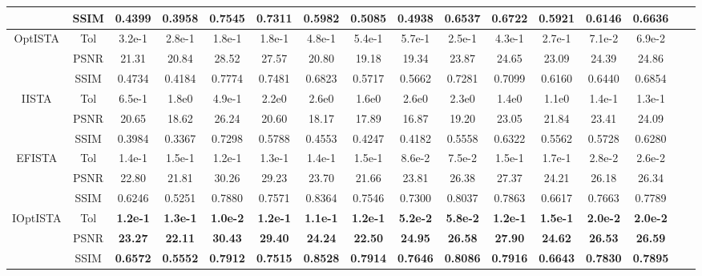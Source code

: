 \documentclass{article}
\begin{document}
\begin{table*}[thp]
\begin{center}
\begin{tabular}{c|c|c c | cc | cc| cc| cc| cc cc }
      & SSIM & 0.4399 &0.3958 & 0.7545 & 0.7311  & 0.5982 & 0.5085 & 0.4938 & 0.6537 & 0.6722 & 0.5921 & 0.6146 & 0.6636  \\\hline
    \multirow{3}{*}{OptISTA} & Tol & 3.2e-1 & 2.8e-1 & 1.8e-1 & 1.8e-1  & 4.8e-1 & 5.4e-1 & 5.7e-1 & 2.5e-1 & 4.3e-1 & 2.7e-1 & 7.1e-2  & 6.9e-2    \\
	  & PSNR & 21.31 & 20.84 & 28.52 & 27.57  & 20.80 & 19.18 & 19.34 & 23.87 & 24.65 & 23.09 & 24.39 & 24.86  \\ 
      & SSIM & 0.4734 & 0.4184 & 0.7774 & 0.7481  & 0.6823 & 0.5717 & 0.5662 & 0.7281 & 0.7099 & 0.6160 & 0.6440 & 0.6854   \\\hline
\multirow{3}{*}{IISTA} & Tol & 6.5e-1 &1.8e0 & 4.9e-1 & 2.2e0  & 2.6e0 & 1.6e0 & 2.6e0 & 2.3e0 & 1.4e0 & 1.1e0 & 1.4e-1 & 1.3e-1    \\
	  & PSNR & 20.65 &18.62 & 26.24 & 20.60  & 18.17 & 17.89 & 16.87 & 19.20 & 23.05 & 21.84 & 23.41 & 24.09  \\ 
      & SSIM & 0.3984 & 0.3367 & 0.7298 & 0.5788  & 0.4553 & 0.4247 & 0.4182 & 0.5558 & 0.6322 & 0.5562 & 0.5728 & 0.6280   \\\hline
\multirow{3}{*}{EFISTA} & Tol & 1.4e-1 &1.5e-1 & 1.2e-1 & 1.3e-1  & 1.4e-1 & 1.5e-1 & 8.6e-2 & 7.5e-2 & 1.5e-1 & 1.7e-1 & 2.8e-2 & 2.6e-2    \\
	  & PSNR & 22.80 &21.81 & 30.26 & 29.23  & 23.70 & 21.66 & 23.81 & 26.38 & 27.37 & 24.21 & 26.18 & 26.34  \\ 
      & SSIM & 0.6246 &0.5251 & 0.7880 & 0.7571  & 0.8364 & 0.7546 & 0.7300 & 0.8037 & 0.7863 & 0.6617 & 0.7663 & 0.7789   \\\hline
\multirow{3}{*}{IOptISTA} & Tol & \textbf{1.2e-1} &\textbf{1.3e-1} & \textbf{1.0e-2} & \textbf{1.2e-1}  & \textbf{1.1e-1} & \textbf{1.2e-1} & \textbf{5.2e-2} & \textbf{5.8e-2} & \textbf{1.2e-1} & \textbf{1.5e-1} & \textbf{2.0e-2} & \textbf{2.0e-2}    \\
	  & PSNR & \textbf{23.27} &\textbf{22.11} & \textbf{30.43} & \textbf{29.40}  & \textbf{24.24} & \textbf{22.50} & \textbf{24.95} & \textbf{26.58} & \textbf{27.90} & \textbf{24.62} & \textbf{26.53} & \textbf{26.59}  \\ 
      & SSIM & \textbf{0.6572} &\textbf{0.5552} & \textbf{0.7912} & \textbf{0.7515}  & \textbf{0.8528} & \textbf{0.7914} & \textbf{0.7646} & \textbf{0.8086} & \textbf{0.7916} & \textbf{0.6643} & \textbf{0.7830} & \textbf{0.7895}  \\\hline
\end{tabular}
\end{center}
\end{table*}
\end{document}
